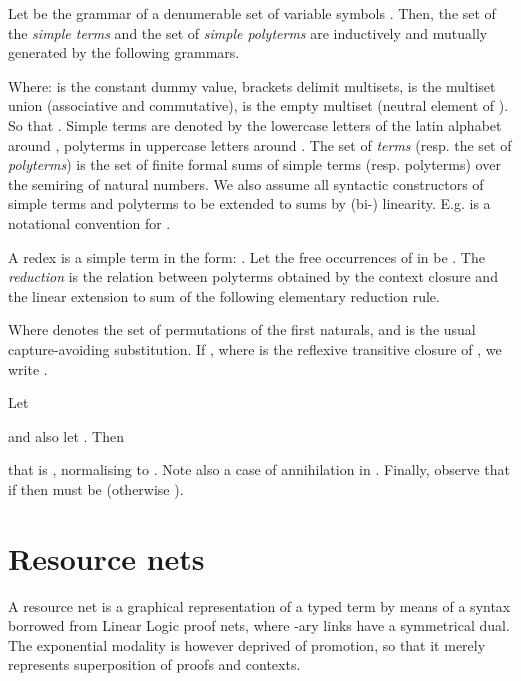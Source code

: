 \begin{definition}[Syntax]\label{def:terms:syntax}
Let  be the grammar of a denumerable set of variable symbols
.
Then, the set  of the \textit{simple terms} and the set 
 of \textit{simple polyterms} are inductively and mutually 
generated by the following grammars.

Where:  is the constant dummy value, brackets delimit multisets, 
 is the multiset union (associative and commutative),  is the empty 
multiset (neutral element of ).
So that .
Simple terms are denoted by the lowercase letters of the latin alphabet 
around , polyterms in uppercase letters around .
The set  of \textit{terms} (resp. the set  of 
\textit{polyterms}) is the set of finite formal sums of simple terms
(resp. polyterms) over the semiring  of natural numbers.
We also assume all syntactic constructors of simple terms and polyterms to be 
extended to sums by (bi-) linearity.
E.g.
 is a notational convention for
.
\end{definition}

\begin{definition}[Reduction]\label{def:RT:reduction}
A redex is a simple term in the form: .
Let the free occurrences of  in  be .
The \textit{reduction} is the relation  between polyterms 
obtained by the context closure and the linear extension to sum of the 
following elementary reduction rule.

Where  denotes the set of permutations of the first  naturals,
and  is the usual capture-avoiding substitution.
If , where  is the reflexive transitive 
closure of , we write .
\end{definition}

\begin{example}
\label{ex:terms}
Let
  
and also let
  .
Then
  
that is ,
normalising to
  .
Note also a case of annihilation in .
Finally, observe that if  then  
must be  (otherwise ).
\end{example}


\section{Resource nets}
\label{sec:nets}

A resource net is a graphical representation of a typed term by means of a 
syntax borrowed from Linear Logic proof nets, where -ary  links have 
a symmetrical dual.
The exponential modality is however deprived of promotion, so that it merely 
represents superposition of proofs and contexts.

